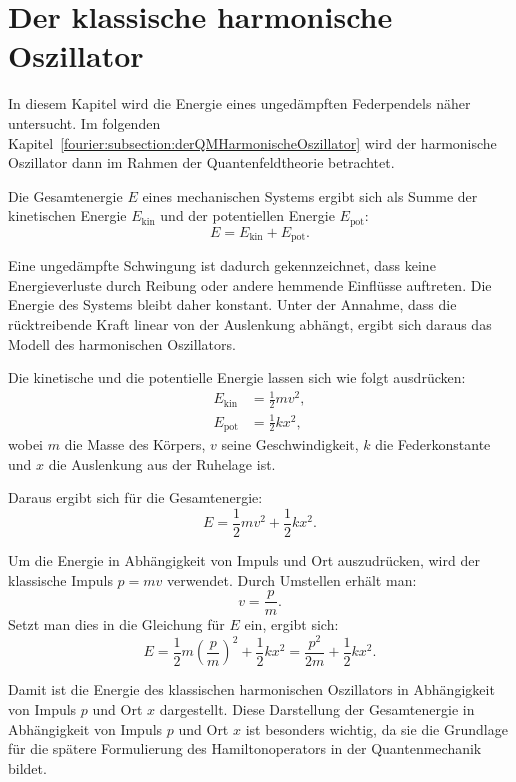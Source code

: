 %
%
%
%

\section{Der klassische harmonische Oszillator\label{fourier:section:derKlassischeHarmonischeOszillator}}

In diesem Kapitel wird die Energie eines ungedämpften Federpendels näher untersucht.  
Im folgenden Kapitel~\ref{fourier:subsection:derQMHarmonischeOszillator} wird der harmonische Oszillator dann im Rahmen der Quantenfeldtheorie betrachtet.

Die Gesamtenergie \( E \) eines mechanischen Systems ergibt sich als Summe der kinetischen Energie \( E_{\text{kin}} \) und der potentiellen Energie \( E_{\text{pot}} \):  
\begin{equation}  
	E = E_{\text{kin}} + E_{\text{pot}}.  
\end{equation}

Eine ungedämpfte Schwingung ist dadurch gekennzeichnet, dass keine Energieverluste durch Reibung oder andere hemmende Einflüsse auftreten.  
Die Energie des Systems bleibt daher konstant.  
Unter der Annahme, dass die rücktreibende Kraft linear von der Auslenkung abhängt, ergibt sich daraus das Modell des harmonischen Oszillators.

Die kinetische und die potentielle Energie lassen sich wie folgt ausdrücken:  
\begin{align}  
	E_{\text{kin}} &= \frac{1}{2} m v^2, \\  
	E_{\text{pot}} &= \frac{1}{2} k x^2,  
\end{align}  
wobei \( m \) die Masse des Körpers, \( v \) seine Geschwindigkeit, \( k \) die Federkonstante und \( x \) die Auslenkung aus der Ruhelage ist.

Daraus ergibt sich für die Gesamtenergie:  
\begin{equation}  
	E = \frac{1}{2} m v^2 + \frac{1}{2} k x^2.  
\end{equation}

Um die Energie in Abhängigkeit von Impuls und Ort auszudrücken, wird der klassische Impuls \( p = m v \) verwendet.  
Durch Umstellen erhält man:  
\[
	v = \frac{p}{m}.  
\]  
Setzt man dies in die Gleichung für \( E \) ein, ergibt sich:  
\begin{equation}\label{fourier:equation:derKlassischeHarmonischeOszillator}  
	E = \frac{1}{2} m {\left(\frac{p}{m}\right)}^{2} + \frac{1}{2} k x^{2} = \frac{p^{2}}{2m} + \frac{1}{2} k x^{2}.
\end{equation}

Damit ist die Energie des klassischen harmonischen Oszillators in Abhängigkeit von Impuls \( p \) und Ort \( x \) dargestellt.  
Diese Darstellung der Gesamtenergie in Abhängigkeit von Impuls \( p \) und Ort \( x \) ist besonders wichtig,  
da sie die Grundlage für die spätere Formulierung des Hamiltonoperators in der Quantenmechanik bildet.

